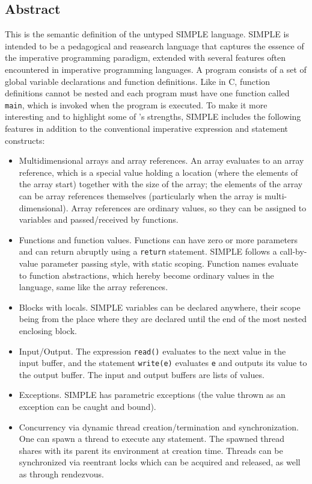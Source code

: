 \begin{latexComment}
\section{Abstract}
This is the \K semantic definition of the untyped SIMPLE language.
SIMPLE is intended to be a pedagogical and reasearch language that captures
the essence of the imperative programming paradigm, extended with several
features often encountered in imperative programming languages.
A program consists of a set of global variable declarations and
function definitions.  Like in C, function definitions cannot be
nested and each program must have one function called \texttt{main},
which is invoked when the program is executed.  To make it more
interesting and to highlight some of \K's strengths, SIMPLE includes
the following features in addition to the conventional imperative
expression and statement constructs:
\begin{itemize}
\item Multidimensional arrays and array references.  An array evaluates
to an array reference, which is a special value holding a location (where
the elements of the array start) together with the size of the array;
the elements of the array can be array references themselves (particularly
when the array is multi-dimensional).  Array references are ordinary values,
so they can be assigned to variables and passed/received by functions.
\item Functions and function values.  Functions can have zero or
more parameters and can return abruptly using a \texttt{return} statement.
SIMPLE follows a call-by-value parameter passing style, with static scoping.
Function names evaluate to function abstractions, which hereby become ordinary
values in the language, same like the array references.
\item Blocks with locals.  SIMPLE variables can be declared
anywhere, their scope being from the place where they are declared
until the end of the most nested enclosing block.
\item Input/Output.  The expression \texttt{read()} evaluates to the
next value in the input buffer, and the statement \texttt{write(e)}
evaluates \texttt{e} and outputs its value to the output buffer.  The
input and output buffers are lists of values.
\item Exceptions.  SIMPLE has parametric exceptions (the value thrown as
an exception can be caught and bound).
\item Concurrency via dynamic thread creation/termination and
synchronization.  One can spawn a thread to execute any statement.
The spawned thread shares with its parent its environment at creation time.
Threads can be synchronized via reentrant locks which can be acquired and
released, as well as through rendezvous.


\end{itemize}
\end{latexComment}
